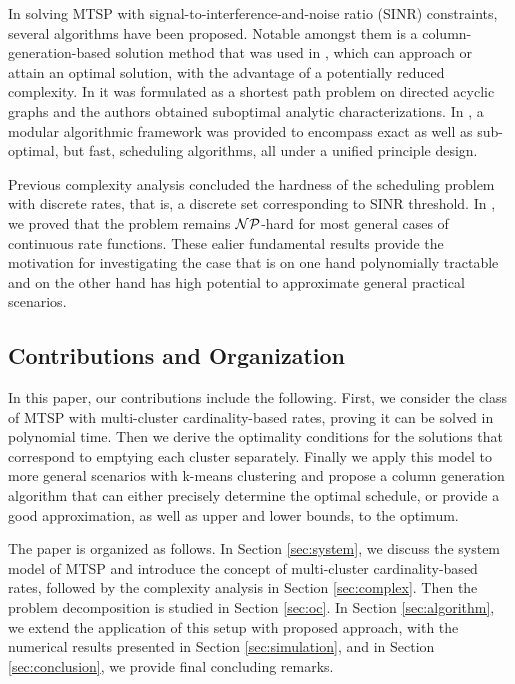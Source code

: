 \documentclass[10pt,onecolumn,journal,draftcls,oneside]{IEEEtran}
\newcounter{cond}
\newcounter{rema}
\begin{document}
In solving MTSP with signal-to-interference-and-noise ratio (SINR) constraints, several algorithms have been proposed. Notable amongst them is a column-generation-based solution method that was used in \cite{KoWi10}, which can approach or attain an optimal solution, with the advantage of a potentially reduced complexity. In \cite{PaEp08} it was formulated as a shortest path problem on directed acyclic graphs and the authors obtained suboptimal analytic characterizations. In \cite{isita2}, a modular algorithmic framework was provided to encompass exact as well as sub-optimal, but fast, scheduling algorithms, all under a unified principle design.

Previous complexity analysis \cite{Ar84,BjVaYu04,BoLiXi10,GoPsWa07} concluded the hardness of the scheduling problem with discrete rates, that is, a discrete set corresponding to SINR threshold. In \cite{j12}, we proved that the problem remains ${\cal NP}$-hard for most general cases of continuous rate functions. These ealier fundamental results provide the motivation for investigating the case that is on one hand polynomially tractable and on the other hand has high potential to approximate general practical scenarios.

\subsection{Contributions and Organization}
In this paper, our contributions include the following. First, we consider the class of MTSP with multi-cluster cardinality-based rates, proving it can be solved in polynomial time. Then we derive the optimality conditions for the solutions that correspond to emptying each cluster separately. Finally we apply this model to more general scenarios with k-means clustering and propose a column generation algorithm that can either precisely determine the optimal schedule, or provide a good approximation, as well as upper and lower bounds, to the optimum.

The paper is organized as follows. In Section \ref{sec:system}, we discuss the system model of MTSP and introduce the concept of multi-cluster cardinality-based rates, followed by the complexity analysis in Section \ref{sec:complex}. Then the problem decomposition is studied in Section \ref{sec:oc}. In Section \ref{sec:algorithm}, we extend the application of this setup with proposed approach, with the numerical results presented in Section \ref{sec:simulation}, and in Section \ref{sec:conclusion}, we provide final concluding remarks.
\end{document}
